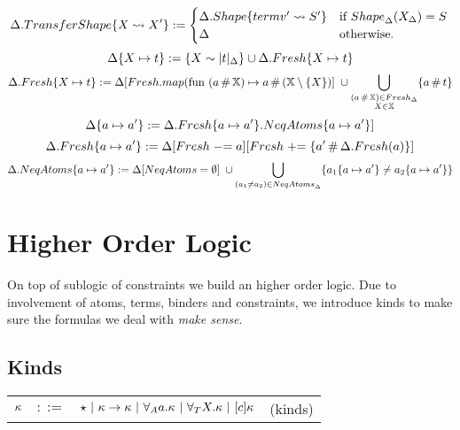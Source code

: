 \documentclass[english, mgr]{iithesis}
\begin{document}
$$
\Delta.{TransferShape}\{X \leadsto X'\} :=
  \begin{cases}
    \Delta.{Shape}\{termv' \leadsto  S'\}    &\text{if } {Shape}_{\Delta}( X_{\Delta}) = S \\
    \Delta &\text{otherwise.}\\
  \end{cases} \\
$$
$$
\Delta\{X \mapsto t\} := \{X \sim  |t|_{\Delta} \} \cup \Delta.{Fresh}\{X \mapsto t\}
$$
$$
\Delta.{Fresh}\{X \mapsto t\} :=
 \Delta[{Fresh}.map(\text{fun } (a \,\#\, \mathbb{X}) \mapsto a \,\#\, (\mathbb{X} \setminus \{ X\})] \;
 \cup \bigcup_{\substack{(a \,\#\, \mathbb{X}) \in {Fresh}_{\Delta} \\ X \in \mathbb{X}}}
    \{ a \,\#\, t \}
$$
$$
\Delta\{a \mapsto a'\} := \Delta.{Fresh}\{a \mapsto a'\}.{NeqAtoms}\{a \mapsto a'\}]
$$
$$
\Delta.{Fresh}\{a \mapsto a'\} := \Delta[{Fresh} \mathrel{-}= a][{Fresh} \mathrel{+}= \{a' \,\#\, \Delta.{Fresh}(a)\}]
$$
$$
\Delta.{NeqAtoms}\{a \mapsto a'\} :=
\Delta[{NeqAtoms} = \emptyset] \;
 \cup \bigcup_{ (a_1 \neq a_2) \in {NeqAtoms}_{\Delta}  }
    \{ a_1\{a \mapsto a'\} \neq a_2\{a \mapsto a'\}\}
$$

\chapter{Higher Order Logic}

On top of sublogic of constraints we build an higher order logic.
Due to involvement of atoms, terms, binders and constraints,
we introduce kinds to make sure the formulas we deal with \textit{make sense}.

\section{Kinds}

\begin{tabular}{rclr}
$\kappa$ & $::=$ & $\star
            \ |\  \kappa \to \kappa
            \ |\  \forall_A a . \kappa
            \ |\  \forall_T X . \kappa
            \ |\  [c] \kappa$
    & (kinds)
\end{tabular}
\end{document}

